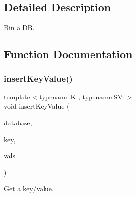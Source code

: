 \subsection{Detailed Description}
Bin a DB. 



\subsection{Function Documentation}
\mbox{\label{adat-devel_2main_2dbutil_2dbbin_8cc_a8dcef9d29a9dfc5045f4ee378e94fca3}} 
\subsubsection{\texorpdfstring{insertKeyValue()}{insertKeyValue()}}
{\footnotesize\ttfamily template$<$typename K , typename SV $>$ \\
void insert\+Key\+Value (\begin{DoxyParamCaption}\item[{\mbox{\hyperlink{classFILEDB_1_1AllConfStoreDB}{All\+Conf\+Store\+DB}}$<$ \mbox{\hyperlink{classADATIO_1_1SerialDBKey}{Serial\+D\+B\+Key}}$<$ K $>$, \mbox{\hyperlink{classADATIO_1_1SerialDBData}{Serial\+D\+B\+Data}}$<$ SV $>$ $>$ \&}]{database,  }\item[{\mbox{\hyperlink{classADATIO_1_1SerialDBKey}{Serial\+D\+B\+Key}}$<$ K $>$ \&}]{key,  }\item[{std\+::vector$<$ \mbox{\hyperlink{classADATIO_1_1SerialDBData}{Serial\+D\+B\+Data}}$<$ SV $>$ $>$ \&}]{vals }\end{DoxyParamCaption})}



Get a key/value. 


